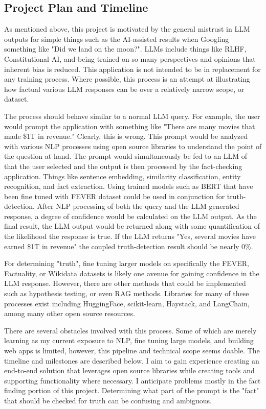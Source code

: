 \documentclass[11pt,letterpaper]{article}
\newcommand{\plan}[1]{
    \subsection*{Project Plan and Timeline}
    \addcontentsline{toc}{subsection}{Timeline and Milestone}
    #1
}
\begin{document}
\plan{

As mentioned above, this project is motivated by the general mistrust in LLM outputs for simple things such as the AI-assisted results when Googling something like "Did we land on the moon?". LLMs include things like RLHF, Constitutional AI, and being trained on so many perspectives and opinions that inherent bias is reduced. This application is not intended to be in replacement for any training process. Where possible, this process is an attempt at illustrating how factual various LLM responses can be over a relatively narrow scope, or dataset.

The process should behave similar to a normal LLM query. For example, the user would prompt the application with something like "There are many movies that made \$1T in revenue." Clearly, this is wrong. This prompt would be analyzed with various NLP processes using open source libraries to understand the point of the question at hand. The prompt would simultaneously be fed to an LLM of that the user selected and the output is then processed by the fact-checking application. Things like sentence embedding, similarity classification, entity recognition, and fact extraction. Using trained models such as BERT that have been fine tuned with FEVER dataset could be used in conjunction for truth-detection. After NLP processing of both the query and the LLM generated response, a degree of confidence would be calculated on the LLM output. As the final result, the LLM output would be returned along with some quantification of the likelihood the response is true. If the LLM returns "Yes, several movies have earned \$1T in revenue" the coupled truth-detection result should be nearly 0\%.

For determining "truth", fine tuning larger models on specifically the FEVER, Factuality, or Wikidata datasets is likely one avenue for gaining confidence in the LLM response. However, there are other methods that could be implemented such as hypothesis testing, or even RAG methods. Libraries for many of these processes exist including HuggingFace, scikit-learn, Haystack, and LangChain, among many other open source resources.

There are several obstacles involved with this process. Some of which are merely learning as my current exposure to NLP, fine tuning large models, and building web apps is limited, however, this pipeline and technical scope seems doable. The timeline and milestones are described below. I aim to gain experience creating an end-to-end solution that leverages open source libraries while creating tools and supporting functionality where necessary. I anticipate problems mostly in the fact finding portion of this project. Determining what part of the prompt is the "fact" that should be checked for truth can be confusing and ambiguous.

}
\end{document}
